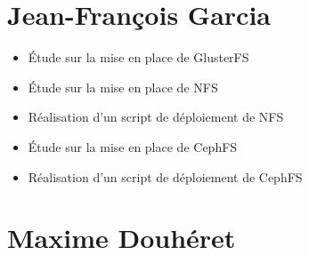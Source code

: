 \documentclass[12pt]{report}
\begin{document}
			\section{Jean-François Garcia}
				\begin{itemize}
					\item Étude sur la mise en place de GlusterFS
					\item Étude sur la mise en place de NFS
					\item Réalisation d'un script de déploiement de NFS
					\item Étude sur la mise en place de CephFS
					\item Réalisation d'un script de déploiement de CephFS
				\end{itemize}
                        \section{Maxime Douhéret}
\end{document}

